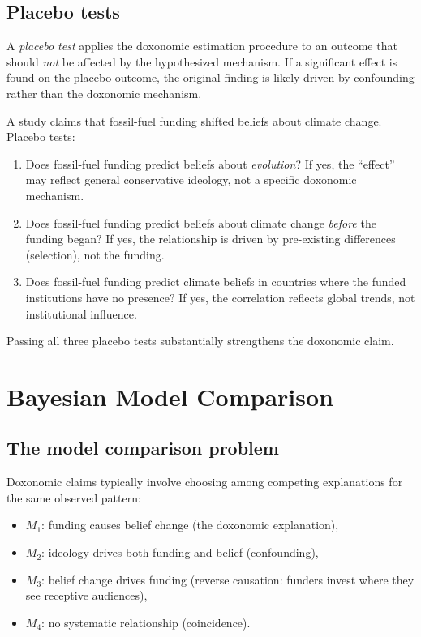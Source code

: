 \subsection{Placebo tests}

\begin{definition}
\label{def:placebo}
A \emph{placebo test} applies the doxonomic estimation procedure to an outcome that should \emph{not} be affected by the hypothesized mechanism.
If a significant effect is found on the placebo outcome, the original finding is likely driven by confounding rather than the doxonomic mechanism.
\end{definition}

\begin{example}
\label{ex:placebo}
A study claims that fossil-fuel funding shifted beliefs about climate change.
Placebo tests:
\begin{enumerate}[nosep]
  \item Does fossil-fuel funding predict beliefs about \emph{evolution}?
  If yes, the ``effect'' may reflect general conservative ideology, not a specific doxonomic mechanism.
  \item Does fossil-fuel funding predict beliefs about climate change \emph{before} the funding began?
  If yes, the relationship is driven by pre-existing differences (selection), not the funding.
  \item Does fossil-fuel funding predict climate beliefs in countries where the funded institutions have no presence?
  If yes, the correlation reflects global trends, not institutional influence.
\end{enumerate}
Passing all three placebo tests substantially strengthens the doxonomic claim.
\end{example}

\section{Bayesian Model Comparison}
\label{sec:ch20-bayesian}

\subsection{The model comparison problem}

Doxonomic claims typically involve choosing among competing explanations for the same observed pattern:
\begin{itemize}[nosep]
  \item $M_1$: funding causes belief change (the doxonomic explanation),
  \item $M_2$: ideology drives both funding and belief (confounding),
  \item $M_3$: belief change drives funding (reverse causation: funders invest where they see receptive audiences),
  \item $M_4$: no systematic relationship (coincidence).
\end{itemize}

